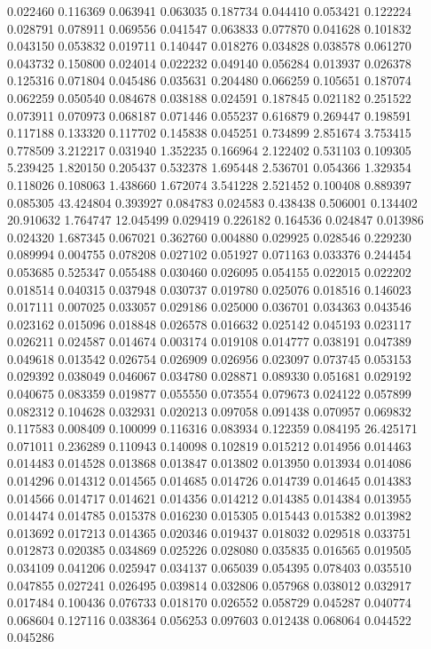 0.022460
0.116369
0.063941
0.063035
0.187734
0.044410
0.053421
0.122224
0.028791
0.078911
0.069556
0.041547
0.063833
0.077870
0.041628
0.101832
0.043150
0.053832
0.019711
0.140447
0.018276
0.034828
0.038578
0.061270
0.043732
0.150800
0.024014
0.022232
0.049140
0.056284
0.013937
0.026378
0.125316
0.071804
0.045486
0.035631
0.204480
0.066259
0.105651
0.187074
0.062259
0.050540
0.084678
0.038188
0.024591
0.187845
0.021182
0.251522
0.073911
0.070973
0.068187
0.071446
0.055237
0.616879
0.269447
0.198591
0.117188
0.133320
0.117702
0.145838
0.045251
0.734899
2.851674
3.753415
0.778509
3.212217
0.031940
1.352235
0.166964
2.122402
0.531103
0.109305
5.239425
1.820150
0.205437
0.532378
1.695448
2.536701
0.054366
1.329354
0.118026
0.108063
1.438660
1.672074
3.541228
2.521452
0.100408
0.889397
0.085305
43.424804
0.393927
0.084783
0.024583
0.438438
0.506001
0.134402
20.910632
1.764747
12.045499
0.029419
0.226182
0.164536
0.024847
0.013986
0.024320
1.687345
0.067021
0.362760
0.004880
0.029925
0.028546
0.229230
0.089994
0.004755
0.078208
0.027102
0.051927
0.071163
0.033376
0.244454
0.053685
0.525347
0.055488
0.030460
0.026095
0.054155
0.022015
0.022202
0.018514
0.040315
0.037948
0.030737
0.019780
0.025076
0.018516
0.146023
0.017111
0.007025
0.033057
0.029186
0.025000
0.036701
0.034363
0.043546
0.023162
0.015096
0.018848
0.026578
0.016632
0.025142
0.045193
0.023117
0.026211
0.024587
0.014674
0.003174
0.019108
0.014777
0.038191
0.047389
0.049618
0.013542
0.026754
0.026909
0.026956
0.023097
0.073745
0.053153
0.029392
0.038049
0.046067
0.034780
0.028871
0.089330
0.051681
0.029192
0.040675
0.083359
0.019877
0.055550
0.073554
0.079673
0.024122
0.057899
0.082312
0.104628
0.032931
0.020213
0.097058
0.091438
0.070957
0.069832
0.117583
0.008409
0.100099
0.116316
0.083934
0.122359
0.084195
26.425171
0.071011
0.236289
0.110943
0.140098
0.102819
0.015212
0.014956
0.014463
0.014483
0.014528
0.013868
0.013847
0.013802
0.013950
0.013934
0.014086
0.014296
0.014312
0.014565
0.014685
0.014726
0.014739
0.014645
0.014383
0.014566
0.014717
0.014621
0.014356
0.014212
0.014385
0.014384
0.013955
0.014474
0.014785
0.015378
0.016230
0.015305
0.015443
0.015382
0.013982
0.013692
0.017213
0.014365
0.020346
0.019437
0.018032
0.029518
0.033751
0.012873
0.020385
0.034869
0.025226
0.028080
0.035835
0.016565
0.019505
0.034109
0.041206
0.025947
0.034137
0.065039
0.054395
0.078403
0.035510
0.047855
0.027241
0.026495
0.039814
0.032806
0.057968
0.038012
0.032917
0.017484
0.100436
0.076733
0.018170
0.026552
0.058729
0.045287
0.040774
0.068604
0.127116
0.038364
0.056253
0.097603
0.012438
0.068064
0.044522
0.045286
